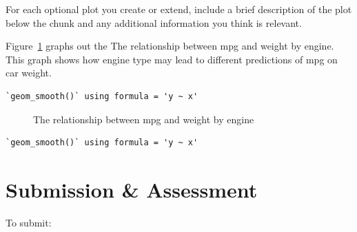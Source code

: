 \documentclass[
  man,
  floatsintext,
  longtable,
  nolmodern,
  notxfonts,
  notimes,
  colorlinks=true,linkcolor=blue,citecolor=blue,urlcolor=blue]{apa7}
\begin{document}
For each optional plot you create or extend, include a brief description
of the plot below the chunk and any additional information you think is
relevant.

Figure~\ref{fig-optional-plot-1} graphs out the The relationship between
mpg and weight by engine. This graph shows how engine type may lead to
different predictions of mpg on car weight.

\begin{verbatim}
`geom_smooth()` using formula = 'y ~ x'
\end{verbatim}

\begin{figure}[H]

\caption{\label{fig-optional-plot-1}The relationship between mpg and
weight by engine}


\end{figure}%

\begin{verbatim}
`geom_smooth()` using formula = 'y ~ x'
\end{verbatim}

\section{Submission \& Assessment}\label{submission-assessment}

To submit:
\end{document}
